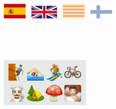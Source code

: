 \documentclass[letterpaper]{twentysecondcv} %
\begin{document}
\begin{LeftPage2} %
              
\includegraphics[width=1.2cm]{img/esp.png}~
\includegraphics[width=1.4cm]{img/eng.png}~
\includegraphics[width=1.2cm]{img/cat.png}~
\includegraphics[width=1.2cm]{img/fin.png} 

\newcommand{\sizebook}{2.3cm}              
     
      
\nonlinear ~\handsonml~\story

\wealth~\dictator~\bitcoin             


  
\vspace{\spaceitems} 
\begin{center}   
   \includegraphics[width=4.5cm]{img/test.png}
\end{center}

\end{LeftPage2}
\end{document}

